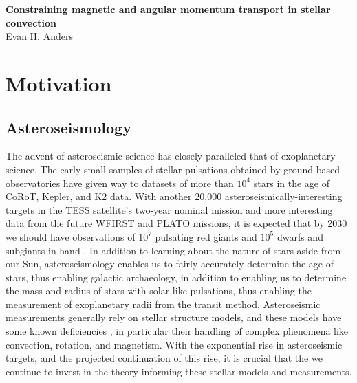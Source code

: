 \documentclass[aasms,12pt]{article}
\begin{document}
\begin{center}
   \large\textbf{Constraining magnetic and angular momentum transport in stellar convection}\\
   \vspace{0.2cm}
   \large{Evan H. Anders}\\
   \vspace{0.2cm}
\end{center}

\vspace{-0.6cm}

\section{Motivation}

\subsection{Asteroseismology}
The advent of asteroseismic science has closely paralleled that of exoplanetary science.
The early small samples of stellar pulsations obtained by ground-based observatories \citep[e.g.,][and others]{kjeldsen&frandsen1991, bouchy&carrier2001, bedding&all2001} have given way to datasets of more than $10^4$ stars \citep[e.g.,][]{yu&all2018, santos&all2019b} in the age of CoRoT, Kepler, and K2 data.
With another 20,000 asteroseismically-interesting targets in the TESS satellite's two-year nominal mission \citep{schofield&all2019} and more interesting data from the future WFIRST and PLATO missions, it is expected that by 2030 we should have observations of $10^7$ pulsating red giants and $10^5$ dwarfs and subgiants in hand  \citep{huber&all2019}.
In addition to learning about the nature of stars aside from our Sun, asteroseismology enables us to fairly accurately determine the age of stars, thus enabling galactic archaeology, in addition to enabling us to determine the mass and radius of stars with solar-like pulsations, thus enabling the measurement of exoplanetary radii from the transit method.
Asteroseismic measurements generally rely on stellar structure models, and these models have some known deficiencies \citep{buldgen2019}, in particular their handling of complex phenomena like convection, rotation, and magnetism.
With the exponential rise in asteroseismic targets, and the projected continuation of this rise, it is crucial that the we continue to invest in the theory informing these stellar models and measurements.
\end{document}
